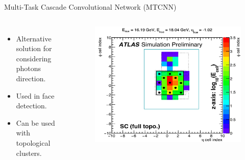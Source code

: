 \begin{frame}{Multi-Task Cascade Convolutional Network (MTCNN)}

\begin{columns}
\begin{itemize}
    \item Alternative solution for considering photons direction.
    \item Used in face detection.
    \item Can be used with topological clusters.
\end{itemize}

\begin{figure}
    \centering
    \includegraphics[width=1.\textwidth]{BackUp/Part6/Img/MTCCN.png}
\end{figure}
\end{columns}
\end{frame}

